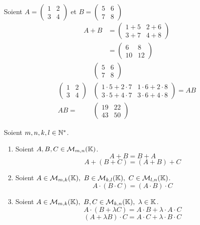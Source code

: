 \begin{example}
	Soient
	$A =
	\begin{pmatrix}
		1 & 2 \\
		3 & 4
	\end{pmatrix}
	$
	et 
	$B =
	\begin{pmatrix}
		5 & 6 \\
		7 & 8
	\end{pmatrix}
	$
	\begin{align*}
		A + B &= 
		\begin{pmatrix}
			1 + 5 & 2 + 6 \\
			3 + 7 & 4 + 8
		\end{pmatrix}
		\\
		&= 
		\begin{pmatrix}
			6 & 8 \\
			10 & 12
		\end{pmatrix}
	\end{align*}
	\begin{align*}
		&\begin{pmatrix}
			5 & 6 \\
			7 & 8
		\end{pmatrix}
		\\
		\begin{pmatrix}
			1 & 2 \\
			3 & 4
		\end{pmatrix}
		&
		\begin{pmatrix}
			1 \cdot 5 + 2 \cdot 7 & 1 \cdot 6 + 2 \cdot 8 \\
			3 \cdot 5 + 4 \cdot 7 & 3 \cdot 6 + 4 \cdot 8
		\end{pmatrix} = AB
		\\
		AB = 
		&\begin{pmatrix}
			19 & 22 \\
			43 & 50
		\end{pmatrix}
	\end{align*}
\end{example}

\begin{proposition}
	Soient $m, n, k, l \in \mathbb{N}^*$.
	\begin{enumerate}
		\item Soient $A, B, C \in \mathcal{M}_{m,n} (\mathbb{K})$.
		\[A + B = B + A\]
		\[A + (B + C) = (A + B) + C\]
		\item Soient $A \in \mathcal{M}_{m, k}(\K),\ B \in \mathcal{M}_{k, l}(\K),\ C \in \mathcal{M}_{l, n}(\K)$.
		\[A \cdot (B \cdot C) = (A \cdot B) \cdot C\]
		\item Soient $A \in \mathcal{M}_{m, k}(\K),\ B, C \in \mathcal{M}_{k, n}(\K),\ \lambda \in \K$.
		\[A \cdot (B + \lambda C) = A \cdot B + \lambda \cdot A \cdot C\]
		\[(A + \lambda B) \cdot C = A \cdot C + \lambda \cdot B \cdot C\]
	\end{enumerate}
\end{proposition}

